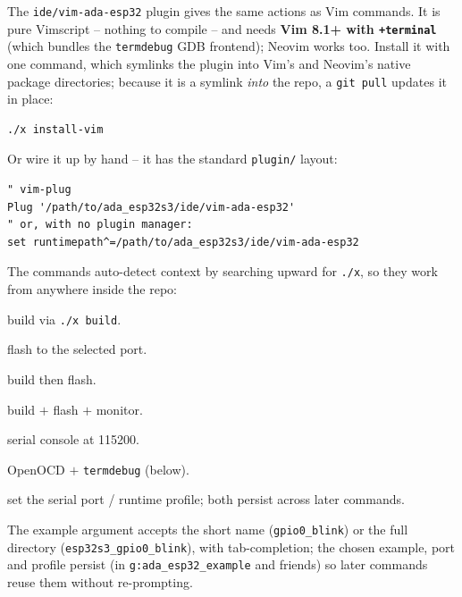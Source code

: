 The \texttt{ide/vim-ada-esp32} plugin gives the same actions as Vim commands. It
is pure Vimscript -- nothing to compile -- and needs \textbf{Vim 8.1+ with
\texttt{+terminal}} (which bundles the \texttt{termdebug} GDB frontend); Neovim
works too. Install it with one command, which symlinks the plugin into Vim's and
Neovim's native package directories; because it is a symlink \emph{into} the repo,
a \texttt{git pull} updates it in place:

\begin{lstlisting}[style=sh]
./x install-vim
\end{lstlisting}

Or wire it up by hand -- it has the standard \texttt{plugin/} layout:

\begin{lstlisting}[style=sh]
" vim-plug
Plug '/path/to/ada_esp32s3/ide/vim-ada-esp32'
" or, with no plugin manager:
set runtimepath^=/path/to/ada_esp32s3/ide/vim-ada-esp32
\end{lstlisting}

The commands auto-detect context by searching upward for \texttt{./x}, so they
work from anywhere inside the repo:

\begin{description}[style=nextline]
\item[{\texttt{:AdaEsp32Build [example]}}] build via \texttt{./x build}.
\item[{\texttt{:AdaEsp32Flash [example]}}] flash to the selected port.
\item[{\texttt{:AdaEsp32BuildFlash [example]}}] build then flash.
\item[{\texttt{:AdaEsp32Run [example]}}] build $+$ flash $+$ monitor.
\item[{\texttt{:AdaEsp32Monitor}}] serial console at 115200.
\item[{\texttt{:AdaEsp32Debug [example]}}] OpenOCD $+$ \texttt{termdebug} (below).
\item[{\texttt{:AdaEsp32Port [port]} / \texttt{:AdaEsp32Profile [prof]}}] set the
  serial port / runtime profile; both persist across later commands.
\end{description}

The example argument accepts the short name (\texttt{gpio0\_blink}) or the full
directory (\texttt{esp32s3\_gpio0\_blink}), with tab-completion; the chosen
example, port and profile persist (in \texttt{g:ada\_esp32\_example} and friends)
so later commands reuse them without re-prompting.

